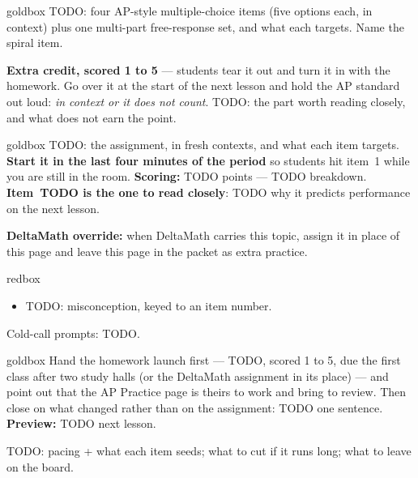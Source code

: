 \documentclass[10pt]{article}
\begin{document}
\boxguard
\begin{skillbox}{goldbox}
TODO: four AP-style multiple-choice items (five options each, in context) plus one multi-part
free-response set, and what each targets. Name the spiral item.

\textbf{Extra credit, scored 1 to 5} --- students tear it out and turn it in with the homework. Go over it at
the start of the next lesson and hold the AP standard out loud: \emph{in context or it does not
count}. TODO: the part worth reading closely, and what does not earn the point.
\end{skillbox}

\boxguard
\begin{skillbox}{goldbox}
TODO: the assignment, in fresh contexts, and what each item targets. \textbf{Start it in the last
four minutes of the period} so students hit item~1 while you are still in the room.
\textbf{Scoring:} TODO points --- TODO breakdown. \textbf{Item~TODO is the one to read closely}:
TODO why it predicts performance on the next lesson.

\textbf{DeltaMath override:} when DeltaMath carries this topic, assign it in place of this page
and leave this page in the packet as extra practice.
\end{skillbox}

\boxguard
\begin{skillbox}{redbox}
\begin{itemize}[leftmargin=1.2em, nosep]
  \item TODO: misconception, keyed to an item number.
\end{itemize}
Cold-call prompts: TODO.
\end{skillbox}

\boxguard
\begin{skillbox}{goldbox}
Hand the homework launch first --- TODO, scored 1 to 5, due the first class after two study halls (or the DeltaMath assignment in
its place) --- and point out that the AP Practice page is theirs to work and bring to review.
Then close on what changed rather than on the assignment: TODO one sentence.
\textbf{Preview:} TODO next lesson.
\end{skillbox}

\begin{teachernote}[Warm-Up]
TODO: pacing + what each item seeds; what to cut if it runs long; what to leave on the board.
\end{teachernote}
\end{document}
